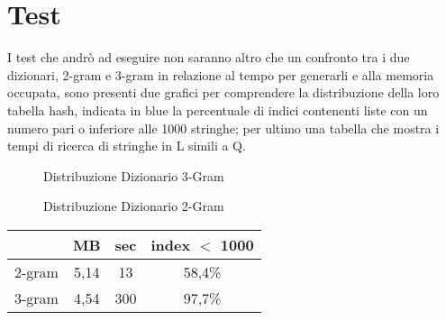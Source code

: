 \documentclass{article}
\begin{document}
\section{Test}
I test che andrò ad eseguire non saranno altro che un confronto tra i due dizionari, 2-gram e 3-gram in relazione al tempo per generarli e alla memoria occupata, sono presenti due grafici per comprendere la distribuzione della loro tabella hash, indicata in blue la percentuale di indici contenenti liste con un numero pari o inferiore alle 1000 stringhe; per ultimo una tabella che mostra i tempi di ricerca di stringhe in L simili a Q.

\begin{figure}[bp!]
    \centering
    \caption{Distribuzione Dizionario 3-Gram}
\end{figure}


\begin{figure}[!ht]
    \centering
    \caption{Distribuzione Dizionario 2-Gram}
\end{figure}

\begin{center}
 \begin{tabular}{||c c c c||} 
 \hline
       & MB & sec & index $<$ 1000\\ [0.5ex] 
 \hline\hline
 2-gram & 5,14 & 13 & 58,4\% \\ 
 \hline
 3-gram & 4,54 & 300 & 97,7\% \\[1ex]
 \hline
 
\end{tabular}
\end{center}
\end{document}
